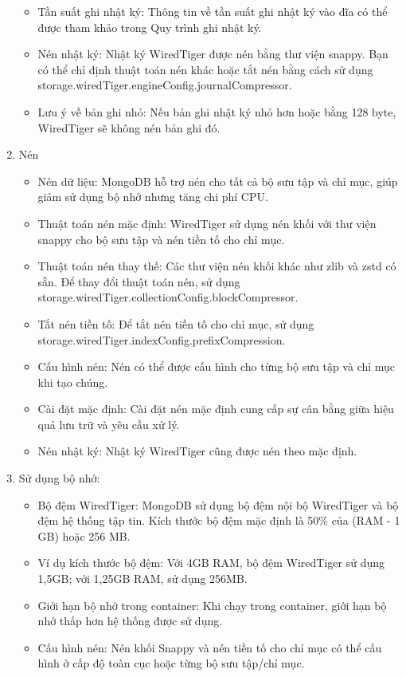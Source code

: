 \begin{enumerate}
\begin{itemize}
        \item Tần suất ghi nhật ký: Thông tin về tần suất ghi nhật ký vào đĩa có thể được tham khảo trong Quy trình ghi nhật ký.
        \item Nén nhật ký: Nhật ký WiredTiger được nén bằng thư viện snappy. Bạn có thể chỉ định thuật toán nén khác hoặc tắt nén bằng cách sử dụng storage.wiredTiger.engineConfig.journalCompressor.
        \item Lưu ý về bản ghi nhỏ: Nếu bản ghi nhật ký nhỏ hơn hoặc bằng 128 byte, WiredTiger sẽ không nén bản ghi đó.
    \end{itemize}
    \item Nén
    \begin{itemize}
        \item Nén dữ liệu: MongoDB hỗ trợ nén cho tất cả bộ sưu tập và chỉ mục, giúp giảm sử dụng bộ nhớ nhưng tăng chi phí CPU.
        \item Thuật toán nén mặc định: WiredTiger sử dụng nén khối với thư viện snappy cho bộ sưu tập và nén tiền tố cho chỉ mục.
        \item Thuật toán nén thay thế: Các thư viện nén khối khác như zlib và zstd có sẵn. Để thay đổi thuật toán nén, sử dụng storage.wiredTiger.collectionConfig.blockCompressor.
        \item Tắt nén tiền tố: Để tắt nén tiền tố cho chỉ mục, sử dụng storage.wiredTiger.indexConfig.prefixCompression.
        \item Cấu hình nén: Nén có thể được cấu hình cho từng bộ sưu tập và chỉ mục khi tạo chúng.
        \item Cài đặt mặc định: Cài đặt nén mặc định cung cấp sự cân bằng giữa hiệu quả lưu trữ và yêu cầu xử lý.
        \item Nén nhật ký: Nhật ký WiredTiger cũng được nén theo mặc định.
    \end{itemize}
    \item Sử dụng bộ nhớ:
    \begin{itemize}
        \item Bộ đệm WiredTiger: MongoDB sử dụng bộ đệm nội bộ WiredTiger và bộ đệm hệ thống tập tin. Kích thước bộ đệm mặc định là 50\% của (RAM - 1 GB) hoặc 256 MB.
        \item Ví dụ kích thước bộ đệm: Với 4GB RAM, bộ đệm WiredTiger sử dụng 1,5GB; với 1,25GB RAM, sử dụng 256MB.
        \item Giới hạn bộ nhớ trong container: Khi chạy trong container, giới hạn bộ nhớ thấp hơn hệ thống được sử dụng.
        \item Cấu hình nén: Nén khối Snappy và nén tiền tố cho chỉ mục có thể cấu hình ở cấp độ toàn cục hoặc từng bộ sưu tập/chỉ mục.

\end{itemize}
\end{enumerate}

